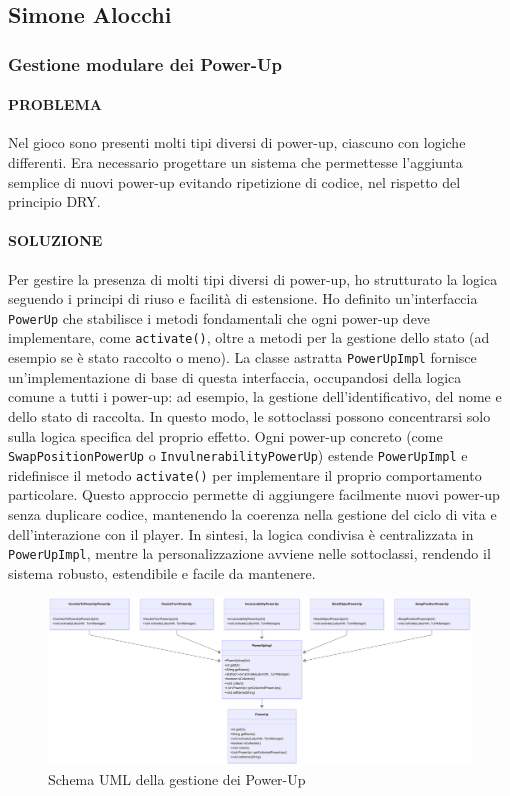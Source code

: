 \documentclass[a4paper,12pt]{report}
\begin{document}
\newpage
\subsection{Simone Alocchi}

\subsubsection*{Gestione modulare dei Power-Up}

\paragraph{PROBLEMA}  
Nel gioco sono presenti molti tipi diversi di power-up, ciascuno con logiche differenti. Era necessario progettare un sistema che permettesse l'aggiunta semplice di nuovi power-up evitando ripetizione di codice, nel rispetto del principio DRY.

\paragraph{SOLUZIONE}  
Per gestire la presenza di molti tipi diversi di power-up, ho strutturato la logica seguendo i principi di riuso e facilità di estensione.  
Ho definito un’interfaccia \texttt{PowerUp} che stabilisce i metodi fondamentali che ogni power-up deve implementare, come \texttt{activate()}, oltre a metodi per la gestione dello stato (ad esempio se è stato raccolto o meno).
La classe astratta \texttt{PowerUpImpl} fornisce un’implementazione di base di questa interfaccia, occupandosi della logica comune a tutti i power-up: ad esempio, la gestione dell’identificativo, del nome e dello stato di raccolta.  
In questo modo, le sottoclassi possono concentrarsi solo sulla logica specifica del proprio effetto.
Ogni power-up concreto (come \texttt{SwapPositionPowerUp} o \texttt{InvulnerabilityPowerUp}) estende \texttt{PowerUpImpl} e ridefinisce il metodo \texttt{activate()} per implementare il proprio comportamento particolare.  
Questo approccio permette di aggiungere facilmente nuovi power-up senza duplicare codice, mantenendo la coerenza nella gestione del ciclo di vita e dell’interazione con il player.
In sintesi, la logica condivisa è centralizzata in \texttt{PowerUpImpl}, mentre la personalizzazione avviene nelle sottoclassi, rendendo il sistema robusto, estendibile e facile da mantenere.
\begin{figure}[H]
	\centering{}
	\includegraphics[width=14cm]{img/GestionePowerUp.png}
	\caption{Schema UML della gestione dei Power-Up}
	\label{img:Gestione PowerUp}
\end{figure}
\end{document}
